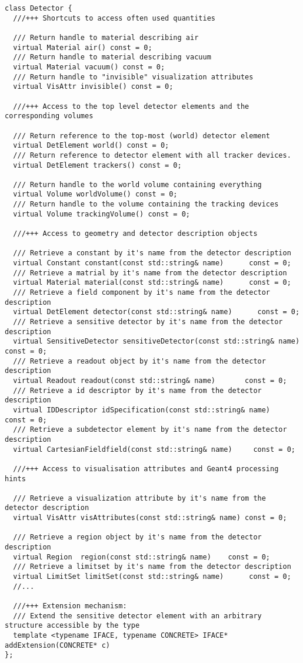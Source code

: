 \begin{verbatim}
class Detector {
  ///+++ Shortcuts to access often used quantities

  /// Return handle to material describing air
  virtual Material air() const = 0;
  /// Return handle to material describing vacuum
  virtual Material vacuum() const = 0;
  /// Return handle to "invisible" visualization attributes
  virtual VisAttr invisible() const = 0;

  ///+++ Access to the top level detector elements and the corresponding volumes

  /// Return reference to the top-most (world) detector element
  virtual DetElement world() const = 0;
  /// Return reference to detector element with all tracker devices.
  virtual DetElement trackers() const = 0;

  /// Return handle to the world volume containing everything
  virtual Volume worldVolume() const = 0;
  /// Return handle to the volume containing the tracking devices
  virtual Volume trackingVolume() const = 0;

  ///+++ Access to geometry and detector description objects

  /// Retrieve a constant by it's name from the detector description
  virtual Constant constant(const std::string& name)      const = 0;
  /// Retrieve a matrial by it's name from the detector description
  virtual Material material(const std::string& name)      const = 0;
  /// Retrieve a field component by it's name from the detector description
  virtual DetElement detector(const std::string& name)      const = 0;
  /// Retrieve a sensitive detector by it's name from the detector description
  virtual SensitiveDetector sensitiveDetector(const std::string& name) const = 0;
  /// Retrieve a readout object by it's name from the detector description
  virtual Readout readout(const std::string& name)       const = 0;
  /// Retrieve a id descriptor by it's name from the detector description
  virtual IDDescriptor idSpecification(const std::string& name)   const = 0;
  /// Retrieve a subdetector element by it's name from the detector description
  virtual CartesianFieldfield(const std::string& name)     const = 0;

  ///+++ Access to visualisation attributes and Geant4 processing hints

  /// Retrieve a visualization attribute by it's name from the detector description
  virtual VisAttr visAttributes(const std::string& name) const = 0;

  /// Retrieve a region object by it's name from the detector description
  virtual Region  region(const std::string& name)    const = 0;
  /// Retrieve a limitset by it's name from the detector description
  virtual LimitSet limitSet(const std::string& name)      const = 0;
  //...
  
  ///+++ Extension mechanism:
  /// Extend the sensitive detector element with an arbitrary structure accessible by the type
  template <typename IFACE, typename CONCRETE> IFACE* addExtension(CONCRETE* c)
};
\end{verbatim}

